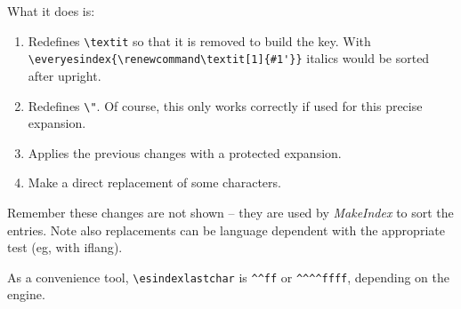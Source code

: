 \documentclass{article}
\begin{document}
What it does is:
\begin{enumerate}
\item Redefines \verb|\textit| so that it is removed to build the key.
With \verb|\everyesindex{\renewcommand\textit[1]{#1'}}| italics would
be sorted after upright.

\item Redefines \verb|\"|. Of course, this only works correctly if used
for this precise expansion.

\item Applies the previous changes with a protected expansion.

\item Make a direct replacement of some characters.

\end{enumerate}
Remember these changes are not shown -- they are used by
\textit{MakeIndex} to sort the entries. Note also replacements can be
language dependent with the appropriate test (eg, with
\textsf{iflang}).

As a convenience tool, \verb|\esindexlastchar| is \verb|^^ff| or
\verb|^^^^ffff|, depending on the engine.
\end{document}

